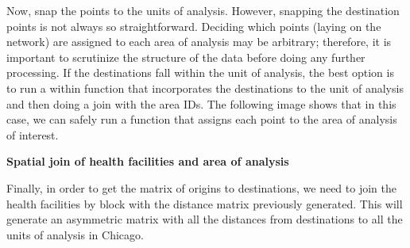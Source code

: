 \documentclass[11pt]{article}
\begin{document}
    Now, snap the points to the units of analysis. However, snapping the
destination points is not always so straightforward. Deciding which
points (laying on the network) are assigned to each area of analysis may
be arbitrary; therefore, it is important to scrutinize the structure of
the data before doing any further processing. If the destinations fall
within the unit of analysis, the best option is to run a within function
that incorporates the destinations to the unit of analysis and then
doing a join with the area IDs. The following image shows that in this
case, we can safely run a function that assigns each point to the area
of analysis of interest.

    

    \textbf{Spatial join of health facilities and area of analysis}

Finally, in order to get the matrix of origins to destinations, we need
to join the health facilities by block with the distance matrix
previously generated. This will generate an asymmetric matrix with all
the distances from destinations to all the units of analysis in Chicago.
\end{document}
